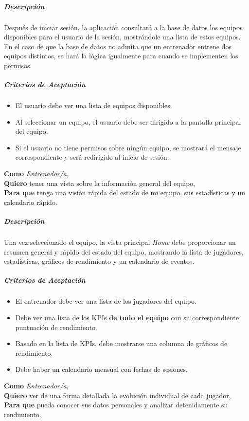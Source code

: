\subparagraph{Descripción}
Después de iniciar sesión, la aplicación consultará a la base de datos los equipos disponibles para el usuario de la sesión, mostrándole una lista de estos equipos. En el caso de que la base de datos no admita que un entrenador entrene dos equipos distintos, se hará la lógica igualmente para cuando se implementen los permisos.

\subparagraph{Criterios de Aceptación}
\begin{itemize}
\item El usuario debe ver una lista de equipos disponibles.
\item Al seleccionar un equipo, el usuario debe ser dirigido a la pantalla principal del equipo.
\item Si el usuario no tiene permisos sobre ningún equipo, se mostrará el mensaje correspondiente y será redirigido al inicio de sesión.
\end{itemize}
\begin{tcolorbox}[title= Vista general del equipo \textit{Home}]
\textbf{Como} \textit{Entrenador/a},\\
\textbf{Quiero} tener una vista sobre la información general del equipo,\\
\textbf{Para que} tenga una visión rápida del estado de mi equipo, sus estadísticas y un calendario rápido.
\end{tcolorbox}

\subparagraph{Descripción}
Una vez seleccionado el equipo, la vista principal \textit{Home} debe proporcionar un resumen general y rápido del estado del equipo, mostrando la lista de jugadores, estadísticas, gráficos de rendimiento y un calendario de eventos.

\subparagraph{Criterios de Aceptación}
\begin{itemize}
\item El entrenador debe ver una lista de los jugadores del equipo.
\item Debe ver una lista de los KPIs \textbf{de todo el equipo} con su correspondiente puntuación de rendimiento.
\item Basado en la lista de KPIs, debe mostrarse una columna de gráficos de rendimiento.
\item Debe haber un calendario mensual con fechas de sesiones.
\end{itemize}
\begin{tcolorbox}[title= Detalles del jugador]
\textbf{Como} \textit{Entrenador/a},\\
\textbf{Quiero} ver de una forma detallada la evolución individual de cada jugador,\\
\textbf{Para que} pueda conocer sus datos personales y analizar detenidamente su rendimiento.
\end{tcolorbox}


